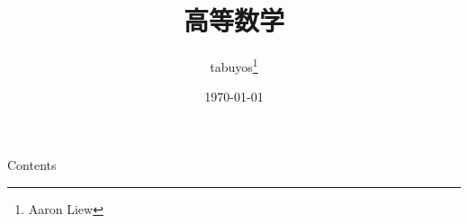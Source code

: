 \documentclass[a4paper,zihao=-4,openany,UTF8]{ctexbook}
\title{高等数学}
\author{tabuyos\thanks{Aaron Liew}}
\date{\today}
\begin{document}
\maketitle
\thispagestyle{empty}
\begin{Mybox}{Contents}
  \makeatletter
  \makeatletter
\end{Mybox}

\cleardoublepage


\end{document}
